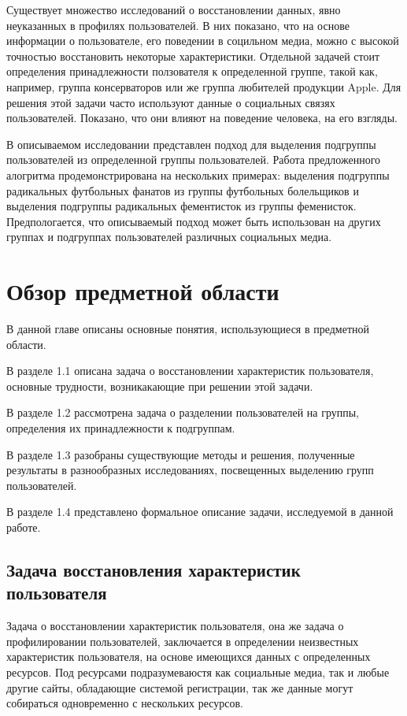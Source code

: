 \documentclass[annotation,times,page4]{itmo-student-thesis}
\begin{document}
Существует множество исследований о восстановлении данных, явно неуказанных в профилях пользователей. В них показано, что на основе информации о пользователе, его поведении в социльном медиа, можно с высокой точностью восстановить некоторые характеристики. 
Отдельной задачей стоит определения принадлежности ползователя к определенной группе, такой как, например, группа консерваторов или же группа любителей продукции Apple. Для решения  этой задачи часто используют данные о социальных связях пользователей. Показано, что они влияют на поведение человека, на его взгляды. 

В описываемом исследовании представлен подход для выделения подгруппы пользователей из определенной группы пользователей. Работа предложенного алогритма продемонстрирована на нескольких примерах: выделения подгруппы радикальных футбольных фанатов из группы футбольных болельщиков и выделения подгруппы радикальных фементисток из группы феменисток. Предпологается, что описываемый подход может быть использован на других группах и подгруппах пользователей различных социальных медиа.

\chapter{Обзор предметной области}
В данной главе описаны основные понятия, использующиеся в предметной области.

В разделе 1.1 описана задача о восстановлении характеристик пользователя, основные трудности, возникакающие при решении этой задачи. 

В разделе 1.2 рассмотрена задача о разделении пользователей на группы, определения их принадлежности к подгруппам.

В разделе 1.3 разобраны существующие методы и решения, полученные результаты в разнообразных исследованиях, посвещенных выделению групп пользователей.

В разделе 1.4 представлено формальное описание задачи, исследуемой в данной работе.

\section{Задача восстановления характеристик пользователя}
Задача о восстановлении характеристик пользователя, она же задача о профилировании пользователей, заключается в определении неизвестных характеристик пользователя, на основе имеющихся данных с определенных ресурсов. Под ресурсами подразумеваюстя как социальные медиа, так и любые другие сайты, обладающие системой регистрации, так же данные могут собираться одновременно с нескольких ресурсов.
\end{document}
